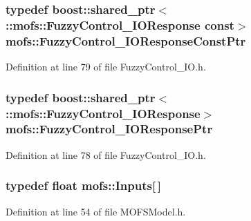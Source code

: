 \subsubsection[{Fuzzy\-Control\-\_\-\-I\-O\-Response\-Const\-Ptr}]{\setlength{\rightskip}{0pt plus 5cm}typedef boost\-::shared\-\_\-ptr$<$ \-::{\bf mofs\-::\-Fuzzy\-Control\-\_\-\-I\-O\-Response} const$>$ {\bf mofs\-::\-Fuzzy\-Control\-\_\-\-I\-O\-Response\-Const\-Ptr}}\label{namespacemofs_abef426dcfb7065c07a5d04c5af5c9327}


Definition at line 79 of file Fuzzy\-Control\-\_\-\-I\-O.\-h.

\subsubsection[{Fuzzy\-Control\-\_\-\-I\-O\-Response\-Ptr}]{\setlength{\rightskip}{0pt plus 5cm}typedef boost\-::shared\-\_\-ptr$<$ \-::{\bf mofs\-::\-Fuzzy\-Control\-\_\-\-I\-O\-Response}$>$ {\bf mofs\-::\-Fuzzy\-Control\-\_\-\-I\-O\-Response\-Ptr}}\label{namespacemofs_a17fab7cc8a8bbdca524530eae2ff5242}


Definition at line 78 of file Fuzzy\-Control\-\_\-\-I\-O.\-h.

\subsubsection[{Inputs}]{\setlength{\rightskip}{0pt plus 5cm}typedef float mofs\-::\-Inputs[$\,$]}\label{namespacemofs_ace54d98e47518beccdea4c0a94975970}


Definition at line 54 of file M\-O\-F\-S\-Model.\-h.

